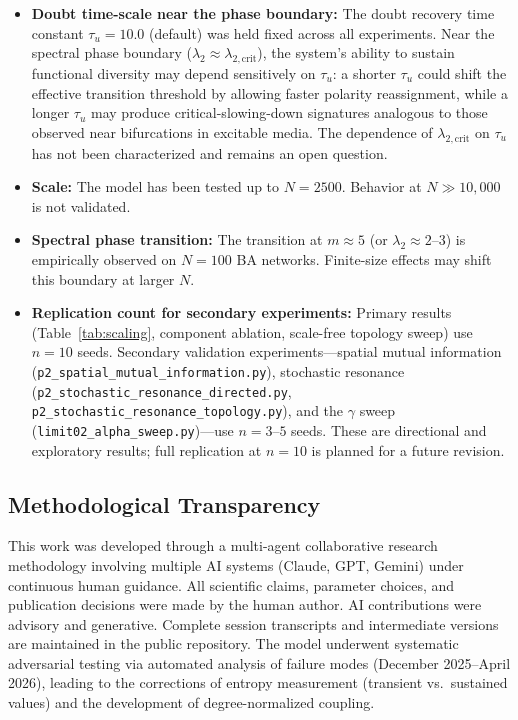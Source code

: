 \documentclass[11pt]{article}
\begin{document}
\begin{itemize}
\item \textbf{Doubt time-scale near the phase boundary:} The doubt recovery time constant $\tau_u = 10.0$ (default) was held fixed across all experiments. Near the spectral phase boundary ($\lambda_2 \approx \lambda_{2,\mathrm{crit}}$), the system's ability to sustain functional diversity may depend sensitively on $\tau_u$: a shorter $\tau_u$ could shift the effective transition threshold by allowing faster polarity reassignment, while a longer $\tau_u$ may produce critical-slowing-down signatures analogous to those observed near bifurcations in excitable media. The dependence of $\lambda_{2,\mathrm{crit}}$ on $\tau_u$ has not been characterized and remains an open question.
\item \textbf{Scale:} The model has been tested up to $N = 2500$. Behavior at $N \gg 10{,}000$ is not validated.
\item \textbf{Spectral phase transition:} The transition at $m \approx 5$ (or $\lambda_2 \approx 2$--$3$) is empirically observed on $N = 100$ BA networks. Finite-size effects may shift this boundary at larger $N$.
\item \textbf{Replication count for secondary experiments:} Primary results (Table~\ref{tab:scaling}, component ablation, scale-free topology sweep) use $n = 10$ seeds. Secondary validation experiments---spatial mutual information (\texttt{p2\_spatial\_mutual\_information.py}), stochastic resonance (\texttt{p2\_stochastic\_resonance\_directed.py}, \texttt{p2\_stochastic\_resonance\_topology.py}), and the $\gamma$ sweep (\texttt{limit02\_alpha\_sweep.py})---use $n = 3$--$5$ seeds. These are directional and exploratory results; full replication at $n = 10$ is planned for a future revision.
\end{itemize}

\subsection{Methodological Transparency}
This work was developed through a multi-agent collaborative research methodology involving multiple AI systems (Claude, GPT, Gemini) under continuous human guidance. All scientific claims, parameter choices, and publication decisions were made by the human author. AI contributions were advisory and generative. Complete session transcripts and intermediate versions are maintained in the public repository. The model underwent systematic adversarial testing via automated analysis of failure modes (December 2025--April 2026), leading to the corrections of entropy measurement (transient vs.\ sustained values) and the development of degree-normalized coupling.
\end{document}
